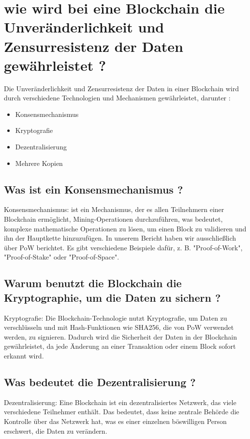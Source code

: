 \documentclass[ngerman]{scrreprt}
\begin{document}
\section{wie wird bei eine Blockchain die Unveränderlichkeit und Zensurresistenz der Daten gewährleistet ?}
 
Die Unveränderlichkeit und Zensurresistenz der Daten in einer Blockchain wird durch verschiedene Technologien und Mechanismen gewährleistet, darunter :

 \begin{itemize}
 	\item Konsensmechanismus
 	\item Kryptografie
 	\item Dezentralisierung
 	\item Mehrere Kopien
 \end{itemize} 
\subsection{Was ist ein Konsensmechanismus ?}\label{blockchain:konsensmechanismus}
Konsensmechanismus: ist ein Mechanismus, der es allen Teilnehmern einer Blockchain ermöglicht, Mining-Operationen durchzuführen, was bedeutet, komplexe mathematische Operationen zu lösen, um einen Block zu validieren und ihn der Hauptkette hinzuzufügen. In unserem Bericht haben wir ausschließlich über PoW berichtet. Es gibt verschiedene Beispiele dafür, z. B. "Proof-of-Work", "Proof-of-Stake" oder "Proof-of-Space".
\subsection{Warum benutzt die Blockchain die Kryptographie, um die Daten zu sichern ?}
Kryptografie: Die Blockchain-Technologie nutzt Kryptografie, um Daten zu verschlüsseln und mit Hash-Funktionen wie SHA256, die von PoW verwendet werden, zu signieren. Dadurch wird die Sicherheit der Daten in der Blockchain gewährleistet, da jede Änderung an einer Transaktion oder einem Block sofort erkannt wird.
\subsection{Was bedeutet die Dezentralisierung ?}\label{blockchain:dezentralisierung}
Dezentralisierung: Eine Blockchain ist ein dezentralisiertes Netzwerk, das viele verschiedene Teilnehmer enthält. Das bedeutet, dass keine zentrale Behörde die Kontrolle über das Netzwerk hat, was es einer einzelnen böswilligen Person erschwert, die Daten zu verändern.
\end{document}
